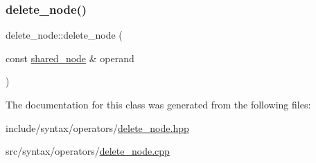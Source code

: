 \subsubsection{\texorpdfstring{delete\+\_\+node()}{delete\_node()}}
{\footnotesize\ttfamily delete\+\_\+node\+::delete\+\_\+node (\begin{DoxyParamCaption}\item[{const \hyperlink{namespacejawe_a3f307481d921b6cbb50cc8511fc2b544}{shared\+\_\+node} \&}]{operand }\end{DoxyParamCaption})}



The documentation for this class was generated from the following files\+:\begin{DoxyCompactItemize}
\item 
include/syntax/operators/\hyperlink{delete__node_8hpp}{delete\+\_\+node.\+hpp}\item 
src/syntax/operators/\hyperlink{delete__node_8cpp}{delete\+\_\+node.\+cpp}\end{DoxyCompactItemize}
